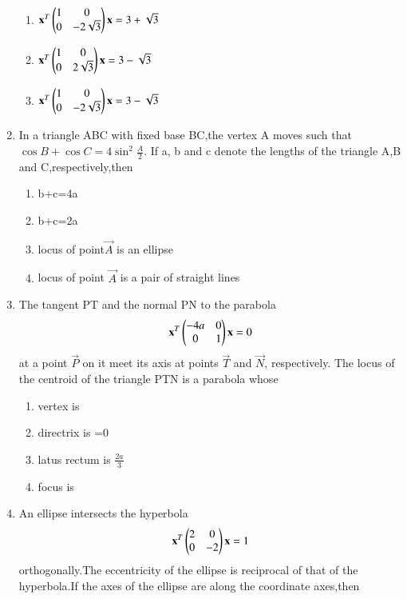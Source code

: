 \begin{enumerate}[label=\arabic*.,ref=\thesubsection.\theenumi]
\begin{enumerate}
    \item $\mathbf{x}^T \begin{pmatrix}1& 0 \\0 & -2\sqrt{3}\end{pmatrix} \mathbf{x}=3+\sqrt{3}$
    \item $\mathbf{x}^T \begin{pmatrix}1& 0 \\0 & 2\sqrt{3}\end{pmatrix}\mathbf{x}=3-\sqrt{3}$
    \item $\mathbf{x}^T\begin{pmatrix}1& 0 \\0 & -2\sqrt{3} \end{pmatrix}\mathbf{x}=3-\sqrt{3}$
    \end{enumerate}
    \item In a triangle ABC with fixed base BC,the vertex A moves such that 
    $\cos B+\cos C=4\sin^2\frac{A}{2}$. If a, b and c denote the lengths of the triangle 
    A,B and C,respectively,then 
    \begin{enumerate}
    \item b+c=4a
    \item b+c=2a
    \item locus of point$\vec{A}$ is an ellipse
    \item locus of point $\vec{A}$ is a pair of straight lines
    \end{enumerate}
    \item The tangent PT and the normal PN to the parabola
    \begin{align}
    \mathbf{x}^T \begin{pmatrix}-4a& 0 \\0 & 1\end{pmatrix}\mathbf{x}=0
    \end{align}at a point $\vec{P}$ on it meet its axis at points $\vec{T}$ and $\vec{N}$, 	respectively. The locus of the centroid of the triangle PTN is a parabola whose
    \begin{enumerate}
    \item vertex is 
    \item directrix is =0
    \item latus rectum is $\frac{2a}{3}$
    \item focus is 
    \end{enumerate}
    \item An ellipse intersects the hyperbola
    \begin{align}
    \mathbf{x}^T \begin{pmatrix}2& 0 \\0 & -2\end{pmatrix}\mathbf{x}=1
    \end{align} orthogonally.The eccentricity of the ellipse is reciprocal of that of the hyperbola.If the axes of the ellipse are along the coordinate axes,then
    \begin{enumerate}

\end{enumerate}
\end{enumerate}
